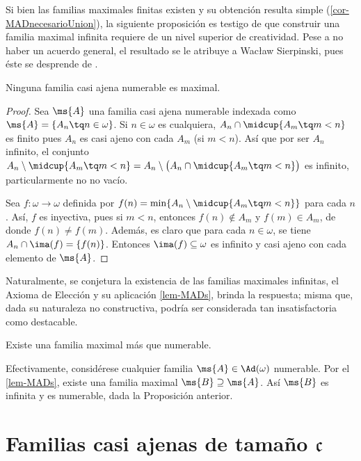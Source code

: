 	Si bien las familias maximales finitas existen y su obtención resulta simple (\autoref{cor-MADnecesarioUnion}), la siguiente proposición es testigo de que construir una familia maximal infinita requiere de un nivel superior de creatividad. Pese a no haber un acuerdo general, el resultado se le atribuye a Wacław Sierpinski, pues éste se desprende de \cite[Teo.~2, p.~458]{SierpinskiCardinal}.
	
	\begin{lema}\label{prop-MADnoNum}
		Ninguna familia casi ajena numerable es maximal.
	\end{lema}
	
	\begin{proof}
		Sea $\ms{A}$ una familia casi ajena numerable indexada como $\ms{A}=\{A_n \tq n \in \omega\}$. Si $n \in \omega$ es cualquiera, $A_n \cap \midcup \{A_m \tq m< n\}$ es finito pues $A_n$ es casi ajeno con cada $A_m$ (si $m<n$). Así que por ser $A_n$ infinito, el conjunto $A_n \setminus \midcup \{A_m \tq m<n\} = A_n \setminus \big( A_n \cap \midcup \{A_m \tq m<n\} \big)$ es infinito, particularmente no no vacío.
	
		Sea $f:\omega \to \omega$ definida por $f(n) = \min\{A_n \setminus \midcup \{A_m \tq m<n\}\}$ para cada $n$. Así, $f$ es inyectiva, pues si $m<n$, entonces $f(n) \notin A_m$ y $f(m) \in A_m$, de donde $f(n) \neq f(m)$. Además, es claro que para cada $n \in \omega$, se tiene $A_n \cap \ima(f) = \{f(n)\}$. Entonces $\ima(f) \subseteq \omega$ es infinito y casi ajeno con cada elemento de $\ms{A}$. 
	\end{proof}
	
	Naturalmente, se conjetura la existencia de las familias maximales infinitas, el Axioma de Elección y su aplicación \ref{lem-MADs}, brinda la respuesta; misma que, dada su naturaleza no constructiva, podría ser considerada tan insatisfactoria como destacable.
	
	\begin{observacion}\label{obs-ExisteNoNumMAD}
		Existe una familia maximal más que numerable. 
		
		Efectivamente, considérese cualquier familia $\ms{A} \in \Ad(\omega)$ numerable. Por el \autoref{lem-MADs}, existe una familia maximal $\ms{B} \supseteq \ms{A}$. Así $\ms{B}$ es infinita y es numerable, dada la Proposición anterior.
	\end{observacion}

	\section{Familias casi ajenas de tamaño \texorpdfstring{$\mathfrak{c}$}{c}}

